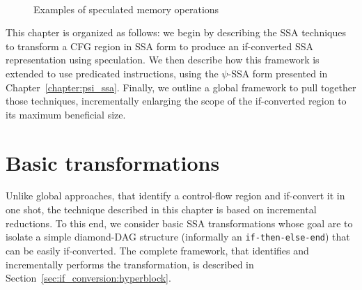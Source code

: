 \begin{figure}[h]
\hfill
{}\\
\hfill
{}
\caption{Examples of speculated memory operations}
\label{fig:spec}
\end{figure}




This chapter is organized as follows: 
we begin by describing the SSA techniques to transform a CFG region in SSA form to produce an if-converted SSA representation using speculation. 
We then describe how this framework is extended to use predicated instructions, using the $\psi$-SSA form presented in Chapter~\ref{chapter:psi_ssa}. 
Finally, we outline a global framework to pull together those techniques, incrementally enlarging the scope of the if-converted region to its maximum beneficial size.

\section{Basic transformations}
\label{sec:basic}

Unlike global approaches, that identify a control-flow region and if-convert it in one shot, the technique described in this chapter is based on incremental reductions. 
To this end, we consider basic SSA transformations whose goal are to isolate a simple diamond-DAG structure (informally an \texttt{if-then-else-end}) that can be easily if-converted. 
The complete framework, that identifies and incrementally performs the transformation, is described in Section~\ref{sec:if_conversion:hyperblock}.

